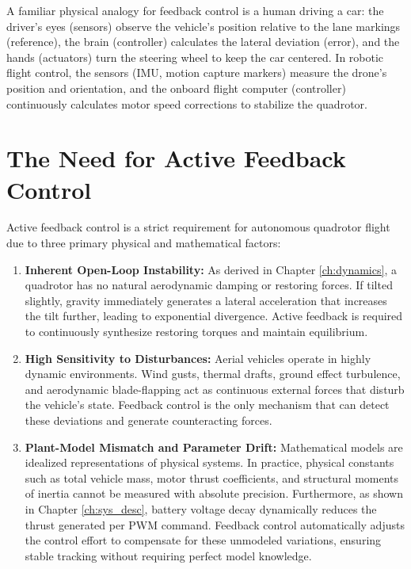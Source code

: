 A familiar physical analogy for feedback control is a human driving a car: the driver's eyes (sensors) observe the vehicle's position relative to the lane markings (reference), the brain (controller) calculates the lateral deviation (error), and the hands (actuators) turn the steering wheel to keep the car centered. In robotic flight control, the sensors (IMU, motion capture markers) measure the drone's position and orientation, and the onboard flight computer (controller) continuously calculates motor speed corrections to stabilize the quadrotor.

\section{The Need for Active Feedback Control}
Active feedback control is a strict requirement for autonomous quadrotor flight due to three primary physical and mathematical factors:
\begin{enumerate}
    \item \textbf{Inherent Open-Loop Instability:} As derived in Chapter \ref{ch:dynamics}, a quadrotor has no natural aerodynamic damping or restoring forces. If tilted slightly, gravity immediately generates a lateral acceleration that increases the tilt further, leading to exponential divergence. Active feedback is required to continuously synthesize restoring torques and maintain equilibrium.
    \item \textbf{High Sensitivity to Disturbances:} Aerial vehicles operate in highly dynamic environments. Wind gusts, thermal drafts, ground effect turbulence, and aerodynamic blade-flapping act as continuous external forces that disturb the vehicle's state. Feedback control is the only mechanism that can detect these deviations and generate counteracting forces.
    \item \textbf{Plant-Model Mismatch and Parameter Drift:} Mathematical models are idealized representations of physical systems. In practice, physical constants such as total vehicle mass, motor thrust coefficients, and structural moments of inertia cannot be measured with absolute precision. Furthermore, as shown in Chapter \ref{ch:sys_desc}, battery voltage decay dynamically reduces the thrust generated per PWM command. Feedback control automatically adjusts the control effort to compensate for these unmodeled variations, ensuring stable tracking without requiring perfect model knowledge.
\end{enumerate}

